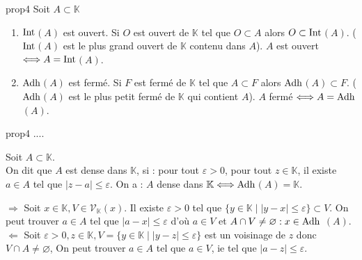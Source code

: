 \documentclass[12pt,a4paper]{report}
\begin{document}
\begin{proposition}{}{prop4}
Soit $A \subset \mathbb{K}$
\begin{enumerate}
\item $\rm{Int}$$(A)$ est ouvert. Si $O$ est ouvert de $\mathbb{K}$ tel que $O \subset A$ alors $O \subset \rm{Int}$$(A)$. 
\newline ($\rm{Int}$$(A)$ est le plus grand ouvert de $\mathbb{K}$ contenu dans $A$). $A$ est ouvert $\Longleftrightarrow A=\rm{Int}$$(A)$.
\item $\rm{Adh}$$(A)$ est fermé. Si $F$ est fermé de $\mathbb{K}$ tel que $A \subset F$ alors $\rm{Adh}$$(A) \subset F$.
\newline ($\rm{Adh}$$(A)$ est le plus petit fermé de $\mathbb{K}$ qui contient $A$). $A$ fermé $\Longleftrightarrow A = \rm{Adh}$$(A)$.
\end{enumerate}
\end{proposition}

\begin{principedemo}{prop4}
.... 
\end{principedemo}


\begin{remarque}[Rappel]
Soit $A \subset \mathbb{K}$.\\
On dit que $A$ est dense dans $\mathbb{K}$, si : pour tout $\varepsilon > 0$, pour tout $z \in \mathbb{K}$, il existe $a \in A$ tel que $\lvert z-a \rvert \leq \varepsilon$.
\newline On a : $A$ dense dans $\mathbb{K} \Longleftrightarrow \rm{Adh}$$(A) = \mathbb{K}$.
\end{remarque}

\begin{demo}{}
$\Longrightarrow$ Soit $x \in \mathbb{K}, V \in \mathcal{V}_\mathbb{K}(x)$. Il existe $\varepsilon > 0$ tel que $\{ y \in \mathbb{K} \mid \lvert y-x \rvert \leq \varepsilon \} \subset V$.
\newline On peut trouver $a \in A$ tel que $\lvert a-x \rvert \leq \varepsilon$ d'où $a \in V$ et $A \cap V \neq \varnothing : x \in \rm{Adh}$ $(A)$.
\newline $\Longleftarrow$ Soit $\varepsilon > 0, z \in \mathbb{K}, V = \{y \in \mathbb{K} \mid \lvert y-z \rvert \leq \varepsilon \}$ est un voisinage de $z$ donc $V \cap A \neq \varnothing$,
\newline On peut trouver $a \in A$ tel que $a \in V$, ie tel que $\lvert a-z \rvert \leq \varepsilon$.
\end{demo}
\end{document}
